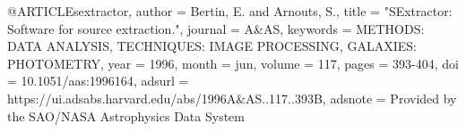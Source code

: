 
@ARTICLE{sextractor,
       author = {{Bertin}, E. and {Arnouts}, S.},
        title = "{SExtractor: Software for source extraction.}",
      journal = {A\&AS},
     keywords = {METHODS: DATA ANALYSIS, TECHNIQUES: IMAGE PROCESSING, GALAXIES: PHOTOMETRY},
         year = 1996,
        month = jun,
       volume = {117},
        pages = {393-404},
          doi = {10.1051/aas:1996164},
       adsurl = {https://ui.adsabs.harvard.edu/abs/1996A&AS..117..393B},
      adsnote = {Provided by the SAO/NASA Astrophysics Data System}
}
